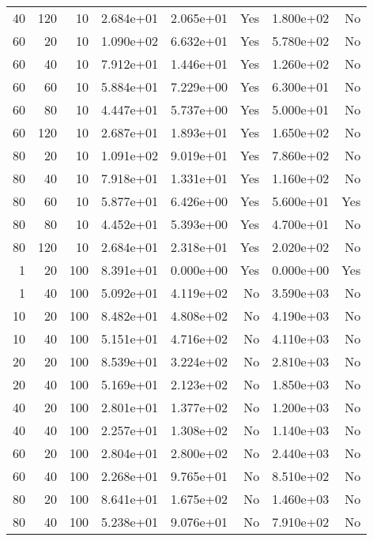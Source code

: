\begin{table}
\begin{tabular}{rrrrrrrr}
40 & 120 & 10 & 2.684e+01 & 2.065e+01 & Yes & 1.800e+02 & No \\
60 & 20 & 10 & 1.090e+02 & 6.632e+01 & Yes & 5.780e+02 & No \\
60 & 40 & 10 & 7.912e+01 & 1.446e+01 & Yes & 1.260e+02 & No \\
60 & 60 & 10 & 5.884e+01 & 7.229e+00 & Yes & 6.300e+01 & No \\
60 & 80 & 10 & 4.447e+01 & 5.737e+00 & Yes & 5.000e+01 & No \\
60 & 120 & 10 & 2.687e+01 & 1.893e+01 & Yes & 1.650e+02 & No \\
80 & 20 & 10 & 1.091e+02 & 9.019e+01 & Yes & 7.860e+02 & No \\
80 & 40 & 10 & 7.918e+01 & 1.331e+01 & Yes & 1.160e+02 & No \\
80 & 60 & 10 & 5.877e+01 & 6.426e+00 & Yes & 5.600e+01 & Yes \\
80 & 80 & 10 & 4.452e+01 & 5.393e+00 & Yes & 4.700e+01 & No \\
80 & 120 & 10 & 2.684e+01 & 2.318e+01 & Yes & 2.020e+02 & No \\
1 & 20 & 100 & 8.391e+01 & 0.000e+00 & Yes & 0.000e+00 & Yes \\
1 & 40 & 100 & 5.092e+01 & 4.119e+02 & No & 3.590e+03 & No \\
10 & 20 & 100 & 8.482e+01 & 4.808e+02 & No & 4.190e+03 & No \\
10 & 40 & 100 & 5.151e+01 & 4.716e+02 & No & 4.110e+03 & No \\
20 & 20 & 100 & 8.539e+01 & 3.224e+02 & No & 2.810e+03 & No \\
20 & 40 & 100 & 5.169e+01 & 2.123e+02 & No & 1.850e+03 & No \\
40 & 20 & 100 & 2.801e+01 & 1.377e+02 & No & 1.200e+03 & No \\
40 & 40 & 100 & 2.257e+01 & 1.308e+02 & No & 1.140e+03 & No \\
60 & 20 & 100 & 2.804e+01 & 2.800e+02 & No & 2.440e+03 & No \\
60 & 40 & 100 & 2.268e+01 & 9.765e+01 & No & 8.510e+02 & No \\
80 & 20 & 100 & 8.641e+01 & 1.675e+02 & No & 1.460e+03 & No \\
80 & 40 & 100 & 5.238e+01 & 9.076e+01 & No & 7.910e+02 & No \\
\bottomrule
\end{tabular}
\end{table}
